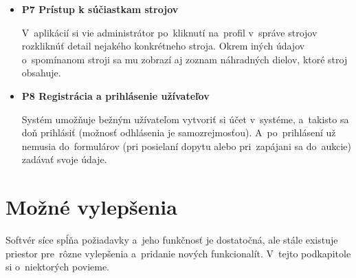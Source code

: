 \begin{itemize}
\item \textbf{P7 Prístup k súčiastkam strojov}

V~aplikácií si vie administrátor po~kliknutí na~profil v~správe strojov rozkliknúť detail nejakého konkrétneho stroja. Okrem iných údajov o~spomínanom stroji sa mu zobrazí aj zoznam náhradných dielov, ktoré stroj obsahuje.

\item \textbf{P8 Registrácia a prihlásenie užívateľov}

Systém umožňuje bežným užívateľom vytvoriť si účet v~systéme, a~takisto sa doň prihlásiť (možnosť odhlásenia je samozrejmosťou). A~po~prihlásení už nemusia do~formulárov (pri posielaní dopytu alebo pri~zapájani sa do~aukcie) zadávať svoje údaje.
\end{itemize}

\section{Možné vylepšenia}

Softvér síce spĺňa požiadavky a~jeho funkčnosť je dostatočná, ale stále existuje priestor pre~rôzne vylepšenia a~pridanie nových funkcionalít. V~tejto podkapitole si o~niektorých povieme.

